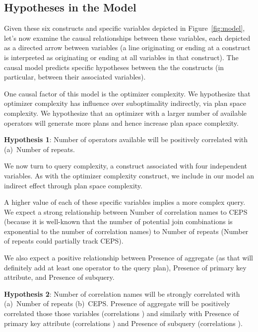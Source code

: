 \documentclass[prodmode,acmtods]{acmsmall}
\begin{document}
\subsection{Hypotheses in the Model}\label{sec:hypotheses}
Given these six constructs and  specific variables depicted in
Figure~\ref{fig:model}, let's now examine the causal relationships between
these variables, each depicted as a directed arrow between variables (a line
originating or ending at a construct is interpreted as originating or ending at all
variables in that construct). The causal model predicts specific hypotheses  between
the the constructs (in particular, between their associated variables).

One causal factor of this model is the optimizer complexity. We hypothesize
that optimizer complexity has influence over suboptimality indirectly, via
plan space complexity. We hypothesize that an optimizer with a larger number
of available operators will generate more plans and hence increase plan
space complexity.

\vspace{0.6em}\noindent
{\bf Hypothesis 1}: Number of operators available will be positively
correlated with (a)~Number of repeats.

\vspace{0.6em}We now turn to query complexity, a construct associated with four
independent variables. As with the optimizer complexity construct, we
include in our model an
indirect effect through plan space complexity.

A higher value of each of these specific variables implies a more complex
query.  We expect a strong relationship between Number of correlation names
to CEPS (because it is well-known that the number of potential join
combinations is exponential to the number of correlation names) to Number of
repeats (Number of repeats could partially track CEPS).

We also expect a positive relationship between Presence of aggregate (as
that will definitely add at least one operator to the query plan), Presence
of primary key attribute, and
Presence of subquery.

\vspace{0.6em}\noindent
{\bf Hypothesis 2}: Number of correlation names will be
strongly correlated with (a)~Number of repeats (b)~CEPS. Presence of aggregate will be positively
correlated those those  variables (correlations ) and similarly
with Presence of primary key attribute
(correlations ) and Presence of subquery (correlations ).
\end{document}
